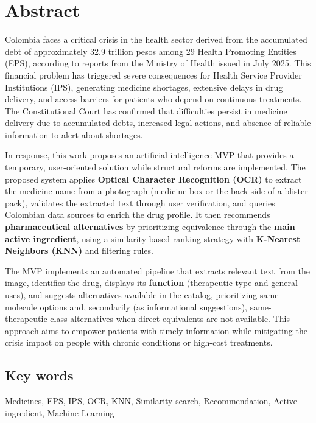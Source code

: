 \section*{Abstract}

Colombia faces a critical crisis in the health sector derived from the accumulated debt of approximately 32.9 trillion pesos among 29 Health Promoting Entities (EPS), according to reports from the Ministry of Health issued in July 2025. This financial problem has triggered severe consequences for Health Service Provider Institutions (IPS), generating medicine shortages, extensive delays in drug delivery, and access barriers for patients who depend on continuous treatments. The Constitutional Court has confirmed that difficulties persist in medicine delivery due to accumulated debts, increased legal actions, and absence of reliable information to alert about shortages.

In response, this work proposes an artificial intelligence MVP that provides a temporary, user-oriented solution while structural reforms are implemented. The proposed system applies \textbf{Optical Character Recognition (OCR)} to extract the medicine name from a photograph (medicine box or the back side of a blister pack), validates the extracted text through user verification, and queries Colombian data sources to enrich the drug profile. It then recommends \textbf{pharmaceutical alternatives} by prioritizing equivalence through the \textbf{main active ingredient}, using a similarity-based ranking strategy with \textbf{K-Nearest Neighbors (KNN)} and filtering rules.

The MVP implements an automated pipeline that extracts relevant text from the image, identifies the drug, displays its \textbf{function} (therapeutic type and general uses), and suggests alternatives available in the catalog, prioritizing same-molecule options and, secondarily (as informational suggestions), same-therapeutic-class alternatives when direct equivalents are not available. This approach aims to empower patients with timely information while mitigating the crisis impact on people with chronic conditions or high-cost treatments.

\subsection*{Key words}
Medicines, EPS, IPS, OCR, KNN, Similarity search, Recommendation, Active ingredient, Machine Learning

\pagebreak